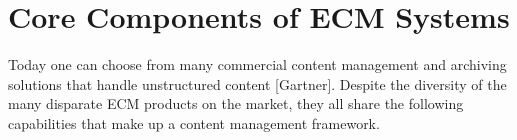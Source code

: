 


\graphicspath{{3/figures/}}




%

\section{Core Components of ECM Systems}
Today one can choose from many commercial content management and archiving solutions that handle unstructured content [Gartner]. Despite the diversity of the many disparate ECM products on the market, they all share the following capabilities that make up a content management framework.  
